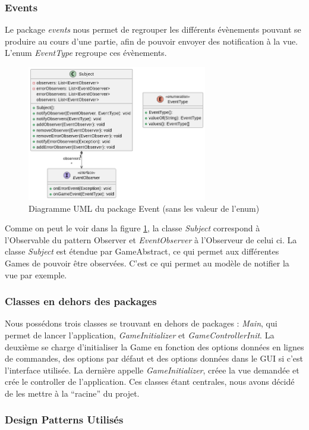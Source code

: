 \documentclass{article}
\begin{document}
\subsubsection{Events}
Le package \textit{events} nous permet de regrouper les différents évènements pouvant se produire au cours d'une partie, afin de pouvoir envoyer des notification à la vue.
L'enum \textit{EventType} regroupe ces évènements.
\begin{figure}[h]
    \centering
    \includegraphics[width=0.7\textwidth]{uml_event}
    \caption{Diagramme UML du package Event (sans les valeur de l'enum)}
    \label{umlEvents}
\end{figure}
\FloatBarrier
Comme on peut le voir dans la figure \ref{umlEvents}, la classe \textit{Subject} correspond à l'Observable du pattern Observer et \textit{EventObserver} à l'Observeur de celui ci.
La classe \textit{Subject} est étendue par GameAbstract, ce qui permet aux différentes Games de pouvoir être observées. C'est ce qui permet au modèle de notifier la vue par exemple.

\subsubsection{Classes en dehors des packages}
Nous possédons trois classes se trouvant en dehors de packages : \textit{Main}, qui permet de lancer l'application, 
\textit{GameInitializer} et \textit{GameControllerInit}. La deuxième se charge d'initialiser la Game en fonction des options données en lignes de commandes, des options par défaut
et des options données dans le GUI si c'est l'interface utilisée. La dernière appelle \textit{GameInitializer}, créee la vue demandée et crée le controller de l'application.
Ces classes étant centrales, nous avons décidé de les mettre à la ``racine'' du projet.
\subsubsection{Design Patterns Utilisés}
\end{document}

